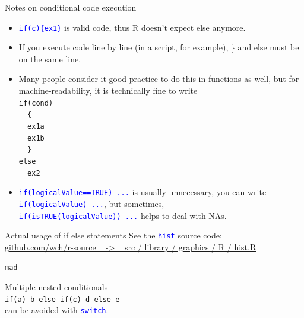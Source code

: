 \documentclass[xcolor=table,      handout ,    xcolor=dvipsnames]{beamer}\usepackage[]{graphicx}\usepackage[]{color}
\makeatletter
\newcommand{\hlstd}[1]{\textcolor[rgb]{0,0,0}{#1}}
\newenvironment{kframe}{%
 \def\at@end@of@kframe{}%
 \ifinner\ifhmode%
  \def\at@end@of@kframe{\end{minipage}}%
  \begin{minipage}{\columnwidth}%
 \fi\fi%
 \def\FrameCommand##1{\hskip\@totalleftmargin \hskip-\fboxsep
 \colorbox{shadecolor}{##1}\hskip-\fboxsep
     \hskip-\linewidth \hskip-\@totalleftmargin \hskip\columnwidth}%
 \MakeFramed {\advance\hsize-\width
   \@totalleftmargin\z@ \linewidth\hsize
   \@setminipage}}%
 {\par\unskip\endMakeFramed%
 \at@end@of@kframe}
\newenvironment{knitrout}{}{} %
\newcommand{\rcode}[1]{\texttt{\textcolor{Blue}{#1}}}
\makeatother
\begin{document}

\begin{frame}[fragile]{Notes on conditional code execution}
\begin{itemize}[<+->]
\item \rcode{\alert{if}(c)\{ex1\}} is valid code, thus R doesn't expect \alert{else} anymore.
\item If you execute code line by line (in a script, for example), \alert{\}} and \alert{else} must be on the same line.
\item Many people consider it good practice to do this in functions as well, but for machine-readability, it is technically fine to write\\
\texttt{\alert{if}(cond)\\
~~\{\\
~~ex1a\\
~~ex1b\\
~~\} \\
\alert{else}\\
~~ex2}
\item \rcode{\alert{if}(logicalValue==TRUE) ...} is usually unnecessary, you can write\\
\onslide<+-> \rcode{\alert{if}(logicalValue) ...}, but sometimes,\\
\onslide<+->  \rcode{\alert{if}(isTRUE(logicalValue)) ...} helps to deal with NAs.
\end{itemize}
\end{frame}


\begin{frame}{Actual usage of if else statements}
See the \rcode{hist} source code: \\
\href{https://github.com/wch/r-source/blob/trunk/src/library/graphics/R/hist.R}{github.com/wch/r-source ~ -> ~ src / library / graphics / R / hist.R}\\[1em]
\pause
\begin{knitrout}
\color{fgcolor}\begin{kframe}
\begin{alltt}
\hlstd{mad}
\end{alltt}
\end{kframe}
\end{knitrout}
\pause
Multiple nested conditionals\\
\texttt{\alert{if}(a) b \alert{else} \alert{if}(c) d \alert{else} e}\\
can be avoided with \rcode{switch}.
\end{frame}
\end{document}
